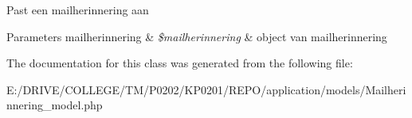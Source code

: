 Past een mailherinnering aan 
\begin{DoxyParams}[1]{Parameters}
mailherinnering & {\em \$mailherinnering} & object van mailherinnering \\
\hline
\end{DoxyParams}


The documentation for this class was generated from the following file\+:\begin{DoxyCompactItemize}
\item 
E\+:/\+D\+R\+I\+V\+E/\+C\+O\+L\+L\+E\+G\+E/\+T\+M/\+P0202/\+K\+P0201/\+R\+E\+P\+O/application/models/Mailherinnering\+\_\+model.\+php\end{DoxyCompactItemize}
